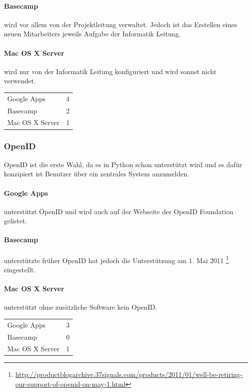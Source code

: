 \paragraph{Basecamp}
\label{par:1.3Basecamp}
wird vor allem von der Projektleitung verwaltet. Jedoch ist das Erstellen eines neuen Mitarbeiters jeweils Aufgabe der Informatik Leitung.
\paragraph{Mac OS X Server}
\label{par:1.3Mac OS X Server}
wird nur von der Informatik Leitung konfiguriert und wird sonnst nicht verwendet.

\begin{tabular}{lc}
Google Apps & 4\\
Basecamp & 2\\
Mac OS X Server & 1\\
\end{tabular}

\subsubsection{OpenID}
\label{ssub:Bewertung OpenID}
OpenID ist die erste Wahl, da es in Python schon unterstützt wird und es dafür konzipiert ist Benutzer über ein zentrales System anzumelden.
\paragraph{Google Apps}
\label{par:2.1Google Apps}
unterstützt OpenID und wird auch auf der Webseite der OpenID Foundation gelistet.
\paragraph{Basecamp}
\label{par:2.1Basecamp}
unterstützte früher OpenID hat jedoch die Unterstützung am 1. Mai 2011 \footnote{\url{http://productblogarchive.37signals.com/products/2011/01/well-be-retiring-our-support-of-openid-on-may-1.html}} eingestellt.
\paragraph{Mac OS X Server}
\label{par:2.1Mac OS X Server}
unterstützt ohne zusätzliche Software kein OpenID.

\begin{tabular}{lc}
Google Apps & 3\\
Basecamp & 0\\
Mac OS X Server & 1\\
\end{tabular}

